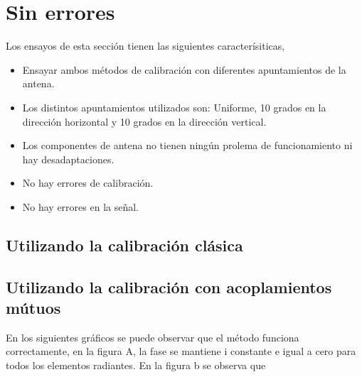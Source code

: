\section{Sin errores}

Los ensayos de esta sección tienen las siguientes caracterísiticas,
\begin{itemize}
	\item Ensayar ambos métodos de calibración con diferentes apuntamientos de la antena.
	\item Los distintos apuntamientos utilizados son: Uniforme, 10 grados en la dirección horizontal y 10 grados en la dirección 
		vertical.
	\item Los componentes de antena no tienen ningún prolema de funcionamiento ni hay desadaptaciones.
	\item No hay errores de calibración.
	\item No hay errores en la señal.
\end{itemize}

\subsection{Utilizando la calibración clásica}
\subsection{Utilizando la calibración con acoplamientos mútuos}

En los siguientes gráficos se puede observar que el método funciona correctamente, en la figura A, la fase se mantiene i
constante e igual a cero para todos los elementos radiantes. En la figura b se observa que 

